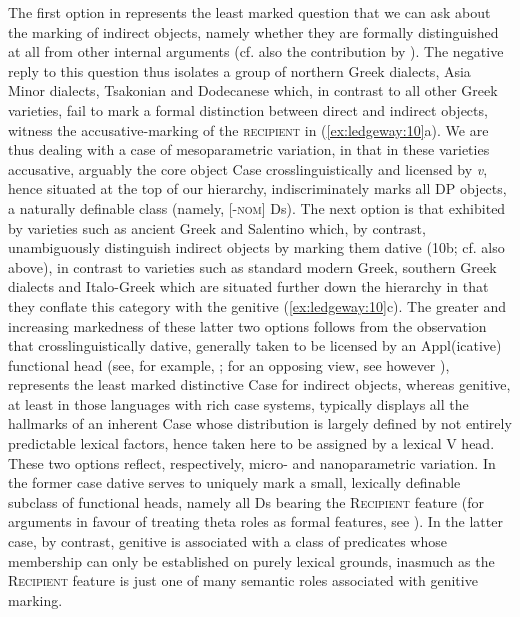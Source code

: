 \documentclass[output=paper,modfonts,nonflat,colorlinks,citecolor=brown]{langsci/langscibook}
\begin{document}
The first option in  represents the least marked question that we can ask about the marking of indirect objects, namely whether they are formally distinguished at all from other internal arguments (cf. also the contribution by ). The negative reply to this question thus isolates a group of northern Greek dialects, Asia Minor dialects, Tsakonian and Dodecanese which, in contrast to all other Greek varieties, fail to mark a formal distinction between direct and indirect objects, witness the accusative-marking of the \textsc{recipient} in (\ref{ex:ledgeway:10}a). We are thus dealing with a case of mesoparametric variation, in that in these varieties accusative, arguably the core object Case crosslinguistically and licensed by \textit{v}, hence situated at the top of our hierarchy, indiscriminately marks all DP objects, a naturally definable class (namely, [-\textsc{nom}] Ds). The next option is that exhibited by varieties such as ancient Greek and Salentino which, by contrast, unambiguously distinguish indirect objects by marking them dative (10b; cf. also  above), in contrast to varieties such as standard modern Greek, southern Greek dialects and Italo-Greek which are situated further down the hierarchy in that they conflate this category with the genitive (\ref{ex:ledgeway:10}c). The greater and increasing markedness of these latter two options follows from the observation that crosslinguistically dative, generally taken to be licensed by an Appl(icative) functional head (see, for example, ; for an opposing view, see however ), represents the least marked distinctive Case for indirect objects, whereas genitive, at least in those languages with rich case systems, typically displays all the hallmarks of an inherent Case whose distribution is largely defined by not entirely predictable lexical factors, hence taken here to be assigned by a lexical V head. These two options reflect, respectively, micro- and nanoparametric variation. In the former case dative serves to uniquely mark a small, lexically definable subclass of functional heads, namely all Ds bearing the \textsc{Recipient} feature (for arguments in favour of treating theta roles as formal features, see \citealt{Hornstein1999}). In the latter case, by contrast, genitive is associated with a class of predicates whose membership can only be established on purely lexical grounds, inasmuch as the \textsc{Recipient} feature is just one of many semantic roles associated with genitive marking. 
\end{document}
